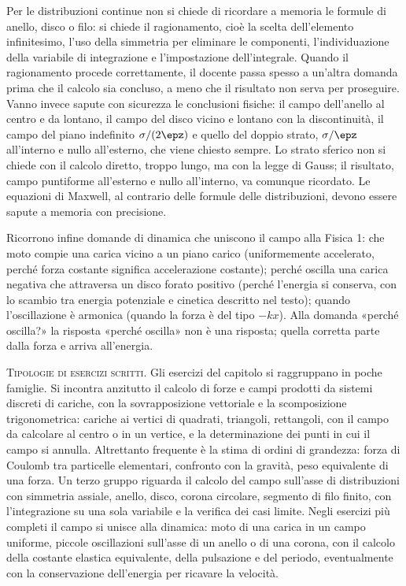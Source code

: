 \documentclass[main.tex]{subfiles}
\begin{document}
Per le distribuzioni continue non si chiede di ricordare a memoria le formule di anello, disco o filo: si chiede il ragionamento, cioè la scelta dell'elemento infinitesimo, l'uso della simmetria per eliminare le componenti, l'individuazione della variabile di integrazione e l'impostazione dell'integrale. Quando il ragionamento procede correttamente, il docente passa spesso a un'altra domanda prima che il calcolo sia concluso, a meno che il risultato non serva per proseguire. Vanno invece sapute con sicurezza le conclusioni fisiche: il campo dell'anello al centro e da lontano, il campo del disco vicino e lontano con la discontinuità, il campo del piano indefinito $\sigma/(2\epz)$ e quello del doppio strato, $\sigma/\epz$ all'interno e nullo all'esterno, che viene chiesto sempre. Lo strato sferico non si chiede con il calcolo diretto, troppo lungo, ma con la legge di Gauss; il risultato, campo puntiforme all'esterno e nullo all'interno, va comunque ricordato. Le equazioni di Maxwell, al contrario delle formule delle distribuzioni, devono essere sapute a memoria con precisione.

Ricorrono infine domande di dinamica che uniscono il campo alla Fisica 1: che moto compie una carica vicino a un piano carico (uniformemente accelerato, perché forza costante significa accelerazione costante); perché oscilla una carica negativa che attraversa un disco forato positivo (perché l'energia si conserva, con lo scambio tra energia potenziale e cinetica descritto nel testo); quando l'oscillazione è armonica (quando la forza è del tipo $-kx$). Alla domanda «perché oscilla?» la risposta «perché oscilla» non è una risposta; quella corretta parte dalla forza e arriva all'energia.

\medskip

\noindent\textsc{Tipologie di esercizi scritti.} Gli esercizi del capitolo si raggruppano in poche famiglie. Si incontra anzitutto il calcolo di forze e campi prodotti da sistemi discreti di cariche, con la sovrapposizione vettoriale e la scomposizione trigonometrica: cariche ai vertici di quadrati, triangoli, rettangoli, con il campo da calcolare al centro o in un vertice, e la determinazione dei punti in cui il campo si annulla. Altrettanto frequente è la stima di ordini di grandezza: forza di Coulomb tra particelle elementari, confronto con la gravità, peso equivalente di una forza. Un terzo gruppo riguarda il calcolo del campo sull'asse di distribuzioni con simmetria assiale, anello, disco, corona circolare, segmento di filo finito, con l'integrazione su una sola variabile e la verifica dei casi limite. Negli esercizi più completi il campo si unisce alla dinamica: moto di una carica in un campo uniforme, piccole oscillazioni sull'asse di un anello o di una corona, con il calcolo della costante elastica equivalente, della pulsazione e del periodo, eventualmente con la conservazione dell'energia per ricavare la velocità.
\end{document}
